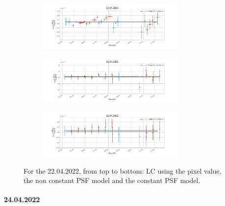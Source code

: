         \begin{figure}[H]
        \centering
        \begin{subfigure}{\textwidth}
            \centering
            \includegraphics[width=0.8\textwidth]{report/Figures/results/lc_2204.png}
        \end{subfigure}%
        \hspace{1em}
        \begin{subfigure}{\textwidth}
            \centering
            \includegraphics[width=0.8\textwidth]{report/Figures/results/lc_2204_psf_notconst.png}
        \end{subfigure}
        \hspace{1em}
        \begin{subfigure}{\textwidth}
            \centering
            \includegraphics[width=0.8\textwidth]{report/Figures/results/lc_2204_psf_const.png}
        \end{subfigure}
        \caption{For the 22.04.2022, from top to bottom: LC using the pixel value, the non constant PSF model and the constant PSF model.}
        \label{22_lc}
        \end{figure}
        

    \paragraph{24.04.2022}

